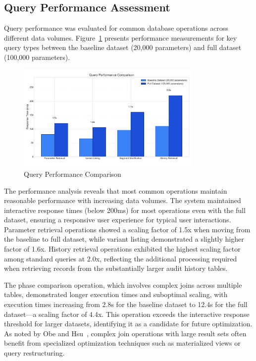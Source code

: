 \subsection{Query Performance Assessment}
\label{subsec:query-performance-assessment}

Query performance was evaluated for common database operations across different data volumes. Figure~\ref{fig:query-performance-comparison} presents performance measurements for key query types between the baseline dataset (20,000 parameters) and full dataset (100,000 parameters).

\begin{figure}[h]
    \centering
    \includegraphics[width=0.8\textwidth]{figures/query_performance_comparison.png}
    \caption{Query Performance Comparison}
    \label{fig:query-performance-comparison}
\end{figure}

The performance analysis reveals that most common operations maintain reasonable performance with increasing data volumes. The system maintained interactive response times (below 200ms) for most operations even with the full dataset, ensuring a responsive user experience for typical user interactions. Parameter retrieval operations showed a scaling factor of 1.5x when moving from the baseline to full dataset, while variant listing demonstrated a slightly higher factor of 1.6x. History retrieval operations exhibited the highest scaling factor among standard queries at 2.0x, reflecting the additional processing required when retrieving records from the substantially larger audit history tables.

The phase comparison operation, which involves complex joins across multiple tables, demonstrated longer execution times and suboptimal scaling, with execution times increasing from 2.8s for the baseline dataset to 12.4s for the full dataset—a scaling factor of 4.4x. This operation exceeds the interactive response threshold for larger datasets, identifying it as a candidate for future optimization. As noted by Obe and Hsu~\cite{obe2017postgresql}, complex join operations with large result sets often benefit from specialized optimization techniques such as materialized views or query restructuring.

